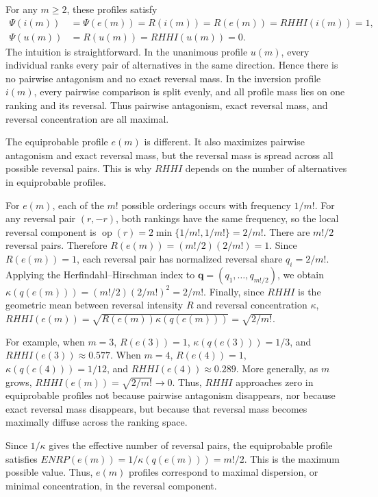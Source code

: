 \documentclass[12pt]{article}
\begin{document}
For any \(m\geq 2\), these profiles satisfy
\[
\begin{aligned}
\Psi(i(m)) &= \Psi(e(m)) = R(i(m)) = R(e(m)) = RHHI(i(m)) = 1,\\
\Psi(u(m)) &= R(u(m)) = RHHI(u(m)) = 0.
\end{aligned}
\]
The intuition is straightforward. In the unanimous profile \(u(m)\), every
individual ranks every pair of alternatives in the same direction. Hence there
is no pairwise antagonism and no exact reversal mass. In the inversion profile
\(i(m)\), every pairwise comparison is split evenly, and all profile mass lies
on one ranking and its reversal. Thus pairwise antagonism, exact reversal mass,
and reversal concentration are all maximal.

The equiprobable profile \(e(m)\) is different. It also maximizes pairwise
antagonism and exact reversal mass, but the reversal mass is spread across all
possible reversal pairs. This is why \(RHHI\) depends on the number of
alternatives in equiprobable profiles.

For \(e(m)\), each of the \(m!\) possible orderings occurs with frequency
\(1/m!\). For any reversal pair \((r,-r)\), both rankings have the same
frequency, so the local reversal component is
\(\operatorname{op}(r)=2\min\{1/m!,1/m!\}=2/m!\). There are \(m!/2\) reversal
pairs. Therefore \(R(e(m))=(m!/2)(2/m!)=1\). Since \(R(e(m))=1\), each reversal
pair has normalized reversal share \(q_i=2/m!\). Applying the
Herfindahl--Hirschman index to \(\mathbf q=(q_1,\ldots,q_{m!/2})\), we obtain
\(\kappa(q(e(m)))=(m!/2)(2/m!)^2=2/m!\). Finally, since \(RHHI\) is the
geometric mean between reversal intensity \(R\) and reversal concentration
\(\kappa\), \(RHHI(e(m))=\sqrt{R(e(m))\kappa(q(e(m)))}=\sqrt{2/m!}\).

For example, when \(m=3\), \(R(e(3))=1\), \(\kappa(q(e(3)))=1/3\), and
\(RHHI(e(3))\approx 0.577\). When \(m=4\), \(R(e(4))=1\),
\(\kappa(q(e(4)))=1/12\), and \(RHHI(e(4))\approx 0.289\). More generally,
as \(m\) grows, \(RHHI(e(m))=\sqrt{2/m!}\to 0\). Thus, \(RHHI\) approaches zero
in equiprobable profiles not because pairwise antagonism disappears, nor
because exact reversal mass disappears, but because that reversal mass becomes
maximally diffuse across the ranking space.

Since \(1/\kappa\) gives the effective number of reversal pairs, the
equiprobable profile satisfies \(ENRP(e(m))=1/\kappa(q(e(m)))=m!/2\). This is
the maximum possible value. Thus, \(e(m)\) profiles correspond to maximal
dispersion, or minimal concentration, in the reversal component.
\end{document}
